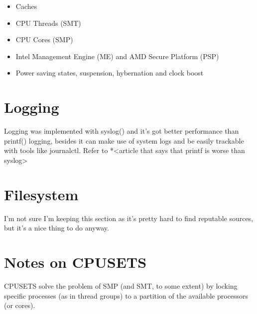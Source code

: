 \documentclass[a4paper,12pt]{report}
\begin{document}
\begin{itemize}
    \item Caches
    \item CPU Threads (SMT)
    \item CPU Cores (SMP)
    \item Intel Management Engine (ME) and AMD Secure Platform (PSP)
    \item Power saving states, suspension, hybernation and clock boost
\end{itemize}

\section{Logging}

Logging was implemented with syslog() and it's got better performance than printf() logging, besides it can make use of system logs and be easily trackable with tools like journalctl. Refer to *<article that says that printf is worse than syslog>

\section{Filesystem}

I'm not sure I'm keeping this section as it's pretty hard to find reputable sources, but it's a nice thing to do anyway. 

\section{Notes on CPUSETS} %

CPUSETS solve the problem of SMP (and SMT, to some extent) by locking specific processes (as in thread groups) to a partition of the available processors (or cores).


\printbibliography
\end{document}
